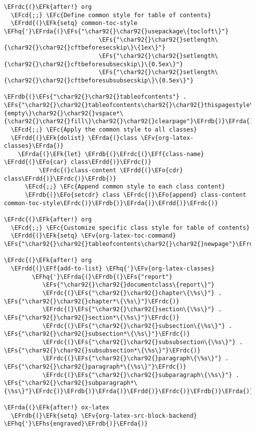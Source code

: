 \documentclass{article}
\newcommand{\EFc}[1]{\textcolor{EFc}{#1}} %
\newcommand{\EFcd}[1]{\textcolor{EFcd}{#1}} %
\newcommand{\EFs}[1]{\textcolor{EFs}{#1}} %
\newcommand{\EFk}[1]{\textcolor{EFk}{#1}} %
\newcommand{\EFf}[1]{\textcolor{EFf}{#1}} %
\newcommand{\EFv}[1]{\textcolor{EFv}{#1}} %
\newcommand{\EFo}[1]{\textcolor{EFo}{#1}} %
\newcommand{\EFhq}[1]{#1} %
\newcommand{\EFhs}[1]{\textcolor{EFhs}{#1}} %
\newcommand{\EFrda}[1]{\textcolor{EFrda}{#1}} %
\newcommand{\EFrdb}[1]{\textcolor{EFrdb}{#1}} %
\newcommand{\EFrdc}[1]{\textcolor{EFrdc}{#1}} %
\newcommand{\EFrdd}[1]{\textcolor{EFrdd}{#1}} %
\begin{document}
\begin{Code}
\begin{Verbatim}
\EFrdc{(}\EFk{after!} org
  \EFcd{;;} \EFc{Define common style for table of contents}
  \EFrdd{(}\EFk{setq} common-toc-style \EFhq{'}\EFrda{(}\EFs{"\char92{}\char92{}usepackage\{tocloft\}"}
                           \EFs{"\char92{}\char92{}setlength\{\char92{}\char92{}cftbeforesecskip\}\{1ex\}"}
                           \EFs{"\char92{}\char92{}setlength\{\char92{}\char92{}cftbeforesubsecskip\}\{0.5ex\}"}
                           \EFs{"\char92{}\char92{}setlength\{\char92{}\char92{}cftbeforesubsubsecskip\}\{0.5ex\}"}
                           \EFrdb{(}\EFs{"\char92{}\char92{}tableofcontents"} . \EFs{"\char92{}\char92{}tableofcontents\char92{}\char92{}thispagestyle\{empty\}\char92{}\char92{}vspace*\{\char92{}\char92{}fill\}\char92{}\char92{}clearpage"}\EFrdb{)}\EFrda{)}\EFrdd{)}
  \EFcd{;;} \EFc{Apply the common style to all classes}
  \EFrdd{(}\EFk{dolist} \EFrda{(}class \EFv{org-latex-classes}\EFrda{)}
    \EFrda{(}\EFk{let} \EFrdb{(}\EFrdc{(}\EFf{class-name} \EFrdd{(}\EFo{car} class\EFrdd{)}\EFrdc{)}
          \EFrdc{(}class-content \EFrdd{(}\EFo{cdr} class\EFrdd{)}\EFrdc{)}\EFrdb{)}
      \EFcd{;;} \EFc{Append common style to each class content}
      \EFrdb{(}\EFo{setcdr} class \EFrdc{(}\EFo{append} class-content common-toc-style\EFrdc{)}\EFrdb{)}\EFrda{)}\EFrdd{)}\EFrdc{)}

\EFrdc{(}\EFk{after!} org
  \EFcd{;;} \EFc{Customize specific class style for table of contents}
  \EFrdd{(}\EFk{setq} \EFv{org-latex-toc-command} \EFs{"\char92{}\char92{}tableofcontents\char92{}\char92{}newpage"}\EFrdd{)}\EFrdc{)}

\EFrdc{(}\EFk{after!} org
  \EFrdd{(}\EFf{add-to-list} \EFhq{'}\EFv{org-latex-classes}
        \EFhq{'}\EFrda{(}\EFrdb{(}\EFs{"report"}
           \EFs{"\char92{}\char92{}documentclass\{report\}"}
           \EFrdc{(}\EFs{"\char92{}\char92{}chapter\{\%s\}"} . \EFs{"\char92{}\char92{}chapter*\{\%s\}"}\EFrdc{)}
           \EFrdc{(}\EFs{"\char92{}\char92{}section\{\%s\}"} . \EFs{"\char92{}\char92{}section*\{\%s\}"}\EFrdc{)}
           \EFrdc{(}\EFs{"\char92{}\char92{}subsection\{\%s\}"} . \EFs{"\char92{}\char92{}subsection*\{\%s\}"}\EFrdc{)}
           \EFrdc{(}\EFs{"\char92{}\char92{}subsubsection\{\%s\}"} . \EFs{"\char92{}\char92{}subsubsection*\{\%s\}"}\EFrdc{)}
           \EFrdc{(}\EFs{"\char92{}\char92{}paragraph\{\%s\}"} . \EFs{"\char92{}\char92{}paragraph*\{\%s\}"}\EFrdc{)}
           \EFrdc{(}\EFs{"\char92{}\char92{}subparagraph\{\%s\}"} . \EFs{"\char92{}\char92{}subparagraph*\{\%s\}"}\EFrdc{)}\EFrdb{)}\EFrda{)}\EFrdd{)}\EFrdc{)}\EFrdb{)}\EFrda{)}

\EFrda{(}\EFk{after!} ox-latex
  \EFrdb{(}\EFk{setq} \EFv{org-latex-src-block-backend} \EFhq{'}\EFhs{engraved}\EFrdb{)}\EFrda{)}

\end{Verbatim}
\end{Code}
\end{document}
